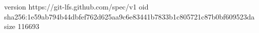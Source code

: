 version https://git-lfs.github.com/spec/v1
oid sha256:1e59ab794b44dbfef762d625aa9c6e83441b7833b1c805721c87b0bf609523da
size 116693
